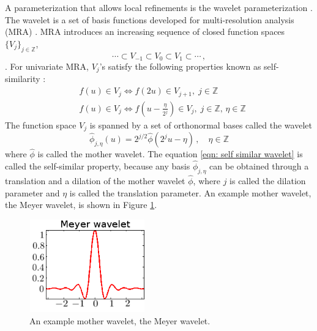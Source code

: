 A parameterization that allows local refinements is the wavelet parameterization
\cite{wavelet mallat}.
The wavelet is a set of basis functions
developed for multi-resolution analysis (MRA) \cite{wavelet mallat}.
MRA introduces an increasing sequence of closed function spaces $\{V_j\}_{j\in \mathbb{Z}}$,
$$\cdots \subset V_{-1} \subset V_0 \subset V_1 \subset \cdots \,,$$
\cite{wavelet mallat}.
For univariate MRA, $V_j$'s satisfy the following properties known as
self-similarity \cite{wavelet mallat}:
\begin{equation*}\begin{split}
    &f(u) \in V_j \Leftrightarrow f(2u) \in V_{j+1}, \; j\in \mathbb{Z}\\
    &f(u) \in V_j \Leftrightarrow f(u-\frac{\eta}{2^j}) \in V_{j},
                    \; j\in \mathbb{Z},\, \eta\in \mathbb{Z}
\end{split}\end{equation*}
The function space $V_j$ is spanned by a set of orthonormal bases called the wavelet
\cite{wavelet mallat}
\begin{equation}
    \hat{\phi}_{j,\eta}(u) = 2^{j/2} \hat{\phi}(2^j u-\eta) \,,\quad \eta \in \mathbb{Z}
    \label{eqn: self similar wavelet}
\end{equation}
where $\hat{\phi}$ is called the mother wavelet.
The equation \eqref{eqn: self similar wavelet} is called the self-similar property, 
because any basis $\hat{\phi}_{j,\eta}$ can be obtained through a translation and a dilation 
of the mother wavelet $\hat{\phi}$, where $j$ is called the dilation parameter and $\eta$
is called the translation parameter.
An example mother wavelet, the Meyer wavelet, is shown in Figure \ref{fig: meyer}.\\

\begin{figure}[Htbp]\begin{center}
    \includegraphics[width=5cm, height=4cm]{../meyer_2.png}
    \caption{An example mother wavelet, the Meyer wavelet.}
    \label{fig: meyer}
\end{center}\end{figure}


